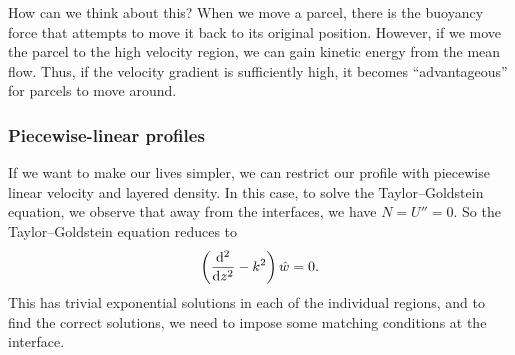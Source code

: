 \documentclass[a4paper]{article}
\begin{document}
How can we think about this? When we move a parcel, there is the buoyancy force that attempts to move it back to its original position. However, if we move the parcel to the high velocity region, we can gain kinetic energy from the mean flow. Thus, if the velocity gradient is sufficiently high, it becomes ``advantageous'' for parcels to move around.

\subsubsection*{Piecewise-linear profiles}
If we want to make our lives simpler, we can restrict our profile with piecewise linear velocity and layered density. In this case, to solve the Taylor--Goldstein equation, we observe that away from the interfaces, we have $N = U'' = 0$. So the Taylor--Goldstein equation reduces to
\[
  \left(\frac{\mathrm{d}^2}{\mathrm{d} z^2} - k^2\right) \hat{w} = 0.
\]
This has trivial exponential solutions in each of the individual regions, and to find the correct solutions, we need to impose some matching conditions at the interface.
\end{document}
